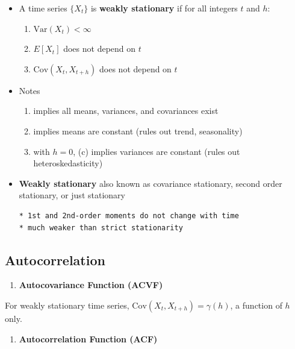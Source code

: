 \documentclass[]{book}
\providecommand{\tightlist}{%
  \setlength{\itemsep}{0pt}\setlength{\parskip}{0pt}}
\begin{document}
\begin{itemize}
\item
  A time series \(\{X_t\}\) is \textbf{weakly stationary} if for all
  integers \(t\) and \(h\):

  \begin{enumerate}
  \def\labelenumi{(\alph{enumi})}
  \tightlist
  \item
    \(\mathrm{Var}(X_t)<\infty\)
  \item
    \(E[X_t]\) does not depend on \(t\)
  \item
    \(\mathrm{Cov}(X_t,X_{t+h})\) does not depend on \(t\)
  \end{enumerate}
\item
  Notes

  \begin{enumerate}
  \def\labelenumi{(\alph{enumi})}
  \tightlist
  \item
    implies all means, variances, and covariances exist
  \item
    implies means are constant (rules out trend, seasonality)
  \item
    with \(h = 0\), (c) implies variances are constant (rules out
    heteroskedasticity)
  \end{enumerate}
\item
  \textbf{Weakly stationary} also known as covariance stationary, second
  order stationary, or just stationary

\begin{verbatim}
* 1st and 2nd-order moments do not change with time
* much weaker than strict stationarity 
\end{verbatim}
\end{itemize}

\subsection{Autocorrelation}\label{autocorrelation-1}

\begin{enumerate}
\def\labelenumi{\arabic{enumi}.}
\tightlist
\item
  \textbf{Autocovariance Function (ACVF)}
\end{enumerate}

For weakly stationary time series,
\(\mathrm{Cov}(X_{t},X_{t+h})=\gamma(h)\), a function of \(h\) only.

\begin{enumerate}
\def\labelenumi{\arabic{enumi}.}
\setcounter{enumi}{1}
\tightlist
\item
  \textbf{Autocorrelation Function (ACF)}
\end{enumerate}
\end{document}
